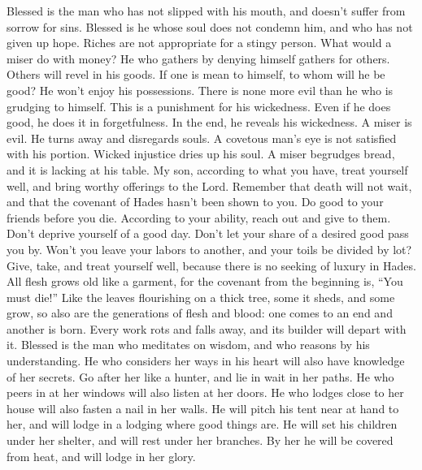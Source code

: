  Blessed is the man who has not slipped with his mouth, and
doesn't suffer from sorrow for sins.  Blessed is he whose
soul does not condemn him, and who has not given up hope. 
Riches are not appropriate for a stingy person. What would a miser do
with money?  He who gathers by denying himself gathers for
others. Others will revel in his goods.  If one is mean to
himself, to whom will he be good? He won't enjoy his possessions.
 There is none more evil than he who is grudging to himself.
This is a punishment for his wickedness.  Even if he does
good, he does it in forgetfulness. In the end, he reveals his
wickedness.  A miser is evil. He turns away and disregards
souls.  A covetous man's eye is not satisfied with his
portion. Wicked injustice dries up his soul.  A miser
begrudges bread, and it is lacking at his table.  My son,
according to what you have, treat yourself well, and bring worthy
offerings to the Lord.  Remember that death will not wait,
and that the covenant of Hades hasn't been shown to you. 
Do good to your friends before you die. According to your ability, reach
out and give to them.  Don't deprive yourself of a good
day. Don't let your share of a desired good pass you by. 
Won't you leave your labors to another, and your toils be divided by
lot?  Give, take, and treat yourself well, because there is
no seeking of luxury in Hades.  All flesh grows old like a
garment, for the covenant from the beginning is, ``You must die!''
 Like the leaves flourishing on a thick tree, some it
sheds, and some grow, so also are the generations of flesh and blood:
one comes to an end and another is born.  Every work rots
and falls away, and its builder will depart with it. 
Blessed is the man who meditates on wisdom, and who reasons by his
understanding.  He who considers her ways in his heart will
also have knowledge of her secrets.  Go after her like a
hunter, and lie in wait in her paths.  He who peers in at
her windows will also listen at her doors.  He who lodges
close to her house will also fasten a nail in her walls. 
He will pitch his tent near at hand to her, and will lodge in a lodging
where good things are.  He will set his children under her
shelter, and will rest under her branches.  By her he will
be covered from heat, and will lodge in her glory.

